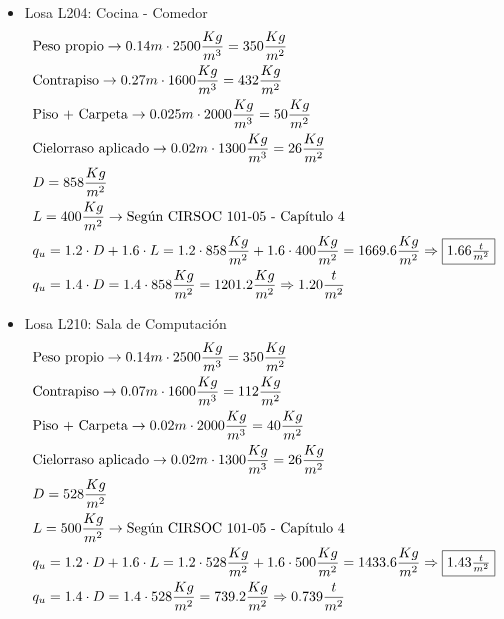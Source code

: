 \begin{enumerate}
\begin{itemize}
\item Losa L204: Cocina - Comedor
\begin{align*}
& \text{Peso propio} \rightarrow 0.14m \cdot 2500 \frac{Kg}{m^3} = 350 \frac{Kg}{m^2}\\
& \text{Contrapiso} \rightarrow 0.27m \cdot 1600 \frac{Kg}{m^3} = 432 \frac{Kg}{m^2}\\
& \text{Piso + Carpeta} \rightarrow 0.025m \cdot 2000 \frac{Kg}{m^3} = 50 \frac{Kg}{m^2}\\
& \text{Cielorraso aplicado} \rightarrow  0.02m \cdot 1300 \frac{Kg}{m^3} = 26 \frac{Kg}{m^2}\\
& D = 858 \frac{Kg}{m^2}\\
& L = 400 \frac{Kg}{m^2} \rightarrow \text{Según CIRSOC 101-05 - Capítulo 4}\\
& q_u = 1.2 \cdot D + 1.6 \cdot L = 1.2 \cdot 858 \frac{Kg}{m^2} + 1.6 \cdot 400 \frac{Kg}{m^2} = 1669.6 \frac{Kg}{m^2} \Rightarrow \framebox{$1.66 \frac{t}{m^2}$}\\
& q_u = 1.4 \cdot D = 1.4 \cdot 858 \frac{Kg}{m^2} = 1201.2 \frac{Kg}{m^2} \Rightarrow 1.20 \frac{t}{m^2}
\end{align*}

\item Losa L210: Sala de Computación
\begin{align*}
& \text{Peso propio} \rightarrow 0.14m \cdot 2500 \frac{Kg}{m^3} = 350 \frac{Kg}{m^2}\\
& \text{Contrapiso} \rightarrow 0.07m \cdot 1600 \frac{Kg}{m^3} = 112 \frac{Kg}{m^2}\\
& \text{Piso + Carpeta} \rightarrow 0.02m \cdot 2000 \frac{Kg}{m^3} = 40 \frac{Kg}{m^2}\\
& \text{Cielorraso aplicado} \rightarrow  0.02m \cdot 1300 \frac{Kg}{m^3} = 26 \frac{Kg}{m^2}\\
& D = 528 \frac{Kg}{m^2}\\
& L = 500 \frac{Kg}{m^2} \rightarrow \text{Según CIRSOC 101-05 - Capítulo 4}\\
& q_u = 1.2 \cdot D + 1.6 \cdot L = 1.2 \cdot 528 \frac{Kg}{m^2} + 1.6 \cdot 500 \frac{Kg}{m^2} = 1433.6 \frac{Kg}{m^2} \Rightarrow \framebox{$1.43 \frac{t}{m^2}$} \\
& q_u = 1.4 \cdot D = 1.4 \cdot 528 \frac{Kg}{m^2} = 739.2 \frac{Kg}{m^2} \Rightarrow 0.739 \frac{t}{m^2}
\end{align*}


\end{itemize}
\end{enumerate}
